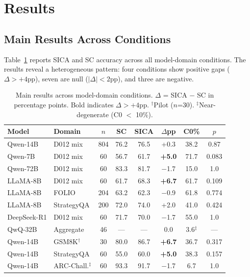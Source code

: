 \documentclass[11pt,a4paper]{article}
\begin{document}
\section{Results}

\subsection{Main Results Across Conditions}

Table~\ref{tab:main} reports SICA and SC accuracy across all model-domain conditions. The results reveal a heterogeneous pattern: four conditions show positive gaps ($\Delta > +4$pp), seven are null ($|\Delta| < 2$pp), and three are negative.

\begin{table}[t]
\centering
\caption{Main results across model-domain conditions. $\Delta$ = SICA $-$ SC in percentage points. Bold indicates $\Delta > +4$pp. $^\dagger$Pilot ($n$=30). $^\ddagger$Near-degenerate (C0 $<$ 10\%).}
\label{tab:main}
\small
\begin{tabular}{llcccccc}
\toprule
\textbf{Model} & \textbf{Domain} & \textbf{$n$} & \textbf{SC} & \textbf{SICA} & \textbf{$\Delta$pp} & \textbf{C0\%} & \textbf{$p$} \\
\midrule
Qwen-14B & D012 mix & 804 & 76.2 & 76.5 & +0.3 & 38.2 & 0.87 \\
Qwen-7B & D012 mix & 60 & 56.7 & 61.7 & \textbf{+5.0} & 71.7 & 0.083 \\
Qwen-72B & D012 mix & 60 & 83.3 & 81.7 & $-$1.7 & 15.0 & 1.0 \\
LLaMA-8B & D012 mix & 60 & 61.7 & 68.3 & \textbf{+6.7} & 61.7 & 0.109 \\
LLaMA-8B & FOLIO & 204 & 63.2 & 62.3 & $-$0.9 & 61.8 & 0.774 \\
LLaMA-8B & StrategyQA & 200 & 72.0 & 74.0 & +2.0 & 41.0 & 0.424 \\
DeepSeek-R1 & D012 mix & 60 & 71.7 & 70.0 & $-$1.7 & 55.0 & 1.0 \\
QwQ-32B & Aggregate & 46 & --- & --- & 0.0 & 3.6$^\ddagger$ & --- \\
Qwen-14B & GSM8K$^\dagger$ & 30 & 80.0 & 86.7 & \textbf{+6.7} & 36.7 & 0.317 \\
Qwen-14B & StrategyQA & 60 & 55.0 & 60.0 & \textbf{+5.0} & 38.3 & 0.157 \\
Qwen-14B & ARC-Chall.$^\ddagger$ & 60 & 93.3 & 91.7 & $-$1.7 & 6.7 & 1.0 \\
\bottomrule
\end{tabular}
\end{table}
\end{document}
